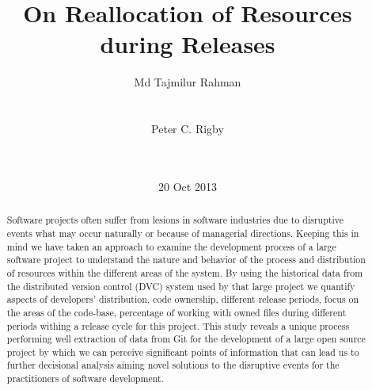 \documentclass{acm_proc_article-sp}
\begin{document}
\title{On Reallocation of Resources during Releases }
\author{
\alignauthor
Md Tajmilur Rahman\\
       \\
       \\
\alignauthor
Peter C. Rigby\\
       \\
       \\
}
\date{20 Oct 2013}
\maketitle
\begin{abstract}
Software projects often suffer from lesions in software industries due to disruptive events what may occur naturally or because of managerial directions. Keeping this in mind we have taken an approach to examine the development process of a large software project to understand the nature and behavior of the process and distribution of resources within the different areas of the system. By using the historical data from the distributed version control (DVC) system used by that large project we quantify aspects of developers' distribution, code ownership, different release periods, focus on the areas of the code-base, percentage of working with owned files during different periods withing a release cycle for this project. This study reveals a unique process performing well extraction of data from Git for the development of a large open source project by which we can perceive significant points of information that can lead us to further decisional analysis aiming novel solutions to the disruptive events for the practitioners of software development.

\end{abstract}
\end{document}

